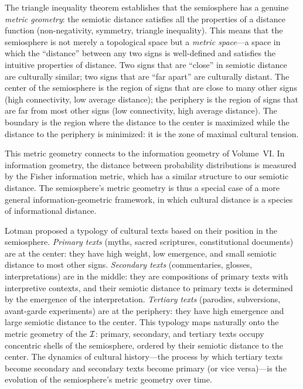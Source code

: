 \begin{interpretation}
The triangle inequality theorem establishes that the semiosphere has a genuine \emph{metric geometry}: the semiotic distance satisfies all the properties of a distance function (non-negativity, symmetry, triangle inequality). This means that the semiosphere is not merely a topological space but a \emph{metric space}---a space in which the ``distance'' between any two signs is well-defined and satisfies the intuitive properties of distance. Two signs that are ``close'' in semiotic distance are culturally similar; two signs that are ``far apart'' are culturally distant. The center of the semiosphere is the region of signs that are close to many other signs (high connectivity, low average distance); the periphery is the region of signs that are far from most other signs (low connectivity, high average distance). The boundary is the region where the distance to the center is maximized while the distance to the periphery is minimized: it is the zone of maximal cultural tension.

This metric geometry connects to the information geometry of Volume~VI. In information geometry, the distance between probability distributions is measured by the Fisher information metric, which has a similar structure to our semiotic distance. The semiosphere's metric geometry is thus a special case of a more general information-geometric framework, in which cultural distance is a species of informational distance.
\end{interpretation}

\begin{remark}
Lotman proposed a typology of cultural texts based on their position in the semiosphere. \emph{Primary texts} (myths, sacred scriptures, constitutional documents) are at the center: they have high weight, low emergence, and small semiotic distance to most other signs. \emph{Secondary texts} (commentaries, glosses, interpretations) are in the middle: they are compositions of primary texts with interpretive contexts, and their semiotic distance to primary texts is determined by the emergence of the interpretation. \emph{Tertiary texts} (parodies, subversions, avant-garde experiments) are at the periphery: they have high emergence and large semiotic distance to the center. This typology maps naturally onto the metric geometry of the $\mathcal{I}$: primary, secondary, and tertiary texts occupy concentric shells of the semiosphere, ordered by their semiotic distance to the center. The dynamics of cultural history---the process by which tertiary texts become secondary and secondary texts become primary (or vice versa)---is the evolution of the semiosphere's metric geometry over time.
\end{remark}

